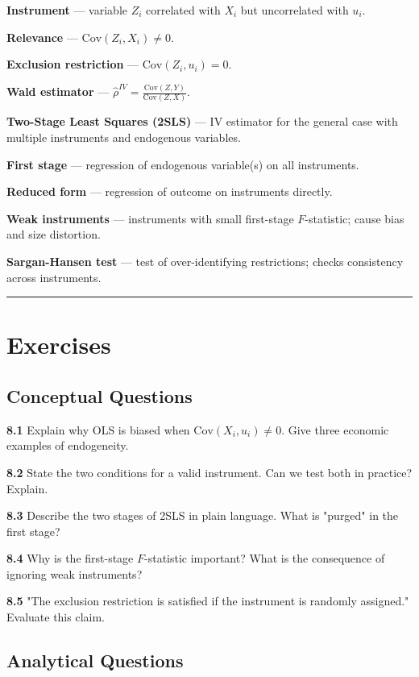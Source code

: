 \textbf{Instrument} --- variable $Z_i$ correlated with $X_i$ but uncorrelated with $u_i$.

\textbf{Relevance} --- $\text{Cov}(Z_i, X_i) \neq 0$.

\textbf{Exclusion restriction} --- $\text{Cov}(Z_i, u_i) = 0$.

\textbf{Wald estimator} --- $\hat{\rho}^{IV} = \frac{\text{Cov}(Z,Y)}{\text{Cov}(Z,X)}$.

\textbf{Two-Stage Least Squares (2SLS)} --- IV estimator for the general case with multiple instruments and endogenous variables.

\textbf{First stage} --- regression of endogenous variable(s) on all instruments.

\textbf{Reduced form} --- regression of outcome on instruments directly.

\textbf{Weak instruments} --- instruments with small first-stage $F$-statistic; cause bias and size distortion.

\textbf{Sargan-Hansen test} --- test of over-identifying restrictions; checks consistency across instruments.

\medskip\hrule\medskip

\section{Exercises}

\subsection{Conceptual Questions}

\textbf{8.1} Explain why OLS is biased when $\text{Cov}(X_i, u_i) \neq 0$. Give three economic examples of endogeneity.

\textbf{8.2} State the two conditions for a valid instrument. Can we test both in practice? Explain.

\textbf{8.3} Describe the two stages of 2SLS in plain language. What is "purged" in the first stage?

\textbf{8.4} Why is the first-stage $F$-statistic important? What is the consequence of ignoring weak instruments?

\textbf{8.5} "The exclusion restriction is satisfied if the instrument is randomly assigned." Evaluate this claim.

\subsection{Analytical Questions}

